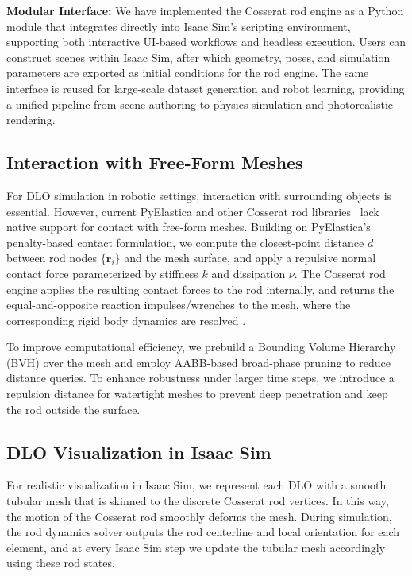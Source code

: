 \documentclass[letterpaper, 10 pt, conference]{ieeeconf}  %
\begin{document}
\noindent\textbf{Modular Interface:} We have implemented the Cosserat rod engine as a Python module that integrates directly into Isaac Sim’s scripting environment, supporting both interactive UI-based workflows and headless execution. Users can construct scenes within Isaac Sim, after which geometry, poses, and simulation parameters are exported as initial conditions for the rod engine. The same interface is reused for large-scale dataset generation and robot learning, providing a unified pipeline from scene authoring to physics simulation and photorealistic rendering.

\subsection{Interaction with Free-Form Meshes}

For DLO simulation in robotic settings, interaction with surrounding objects is essential. However, current PyElastica and other Cosserat rod libraries~\cite{pyelastica_repo, pyelastica_paper, stable_rod} lack native support for contact with free-form meshes. Building on PyElastica's penalty-based contact formulation, we compute the closest-point distance $d$ between rod nodes $\{\mathbf{r}_i\}$ and the mesh surface, and apply a repulsive normal contact force parameterized by stiffness $k$ and dissipation $\nu$. The Cosserat rod engine applies the resulting contact forces to the rod internally, and returns the equal-and-opposite reaction impulses/wrenches to the mesh, where the corresponding rigid body dynamics are resolved \cite{pyelastica_repo}.

To improve computational efficiency, we prebuild a Bounding Volume Hierarchy (BVH) over the mesh and employ AABB-based broad-phase pruning to reduce distance queries. To enhance robustness under larger time steps, we introduce a repulsion distance for watertight meshes to prevent deep penetration and keep the rod outside the surface. 


\subsection{DLO Visualization in Isaac Sim}
For realistic visualization in Isaac Sim, we represent each DLO with a smooth tubular mesh that is skinned to the discrete Cosserat rod vertices. In this way, the motion of the Cosserat rod smoothly deforms the mesh. During simulation, the rod dynamics solver outputs the rod centerline and local orientation for each element, and at every Isaac Sim step we update the tubular mesh accordingly using these rod states.
\end{document}
